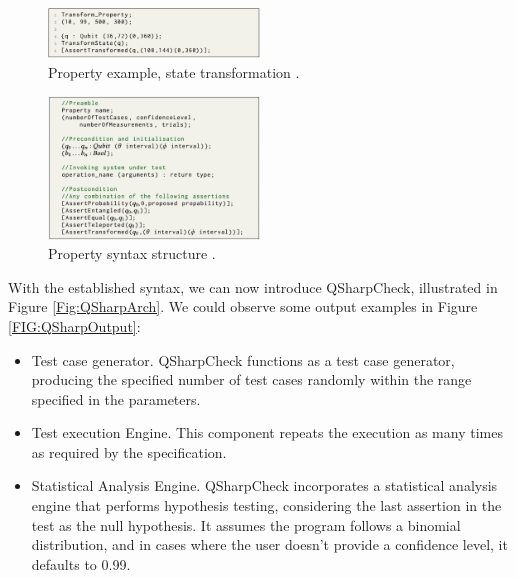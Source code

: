 \begin{itemize}
\vspace{15pt}

\begin{figure}[H]
        \centering
        \includegraphics[width=0.5\textwidth]{TFM/photos/QsharpSyntaxEx.png}
        \caption{Property example, state transformation \cite{honarvar2020property}.} 
        \label{Fig:QSharpSyntaxEx}
\end{figure}

\begin{figure}[H]
        \centering
        \includegraphics[width=0.5\textwidth]{TFM/photos/QsharpSyntax.png}
        \caption{Property syntax structure \cite{honarvar2020property}.} 
        \label{Fig:QSharpSyntax}
\end{figure}


With the established syntax, we can now introduce QSharpCheck, illustrated in Figure \ref{Fig:QSharpArch}. We could observe some output examples in Figure \ref{FIG:QSharpOutput}:

\begin{itemize}
    \item Test case generator. QSharpCheck functions as a test case generator, producing the specified number of test cases randomly within the range specified in the parameters.
    \item Test execution Engine. This component repeats the execution as many times as required by the specification.
    \item Statistical Analysis Engine. QSharpCheck incorporates a statistical analysis engine that performs hypothesis testing, considering the last assertion in the test as the null hypothesis. It assumes the program follows a binomial distribution, and in cases where the user doesn't provide a confidence level, it defaults to 0.99.
\end{itemize}


\end{itemize}
